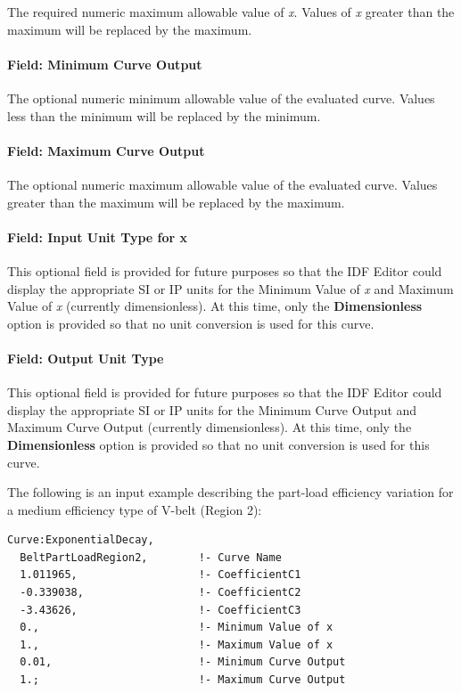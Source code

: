 The required numeric maximum allowable value of \emph{x}. Values of \emph{x} greater than the maximum will be replaced by the maximum.

\paragraph{Field: Minimum Curve Output}\label{field-minimum-curve-output-16}

The optional numeric minimum allowable value of the evaluated curve. Values less than the minimum will be replaced by the minimum.

\paragraph{Field: Maximum Curve Output}\label{field-maximum-curve-output-15}

The optional numeric maximum allowable value of the evaluated curve. Values greater than the maximum will be replaced by the maximum.

\paragraph{Field: Input Unit Type for x}\label{field-input-unit-type-for-x-16}

This optional field is provided for future purposes so that the IDF Editor could display the appropriate SI or IP units for the Minimum Value of \emph{x} and Maximum Value of \emph{x} (currently dimensionless). At this time, only the \textbf{Dimensionless} option is provided so that no unit conversion is used for this curve.

\paragraph{Field: Output Unit Type}\label{field-output-unit-type-15}

This optional field is provided for future purposes so that the IDF Editor could display the appropriate SI or IP units for the Minimum Curve Output and Maximum Curve Output (currently dimensionless). At this time, only the \textbf{Dimensionless} option is provided so that no unit conversion is used for this curve.

The following is an input example describing the part-load efficiency variation for a medium efficiency type of V-belt (Region 2):

\begin{lstlisting}
Curve:ExponentialDecay,
  BeltPartLoadRegion2,        !- Curve Name
  1.011965,                   !- CoefficientC1
  -0.339038,                  !- CoefficientC2
  -3.43626,                   !- CoefficientC3
  0.,                         !- Minimum Value of x
  1.,                         !- Maximum Value of x
  0.01,                       !- Minimum Curve Output
  1.;                         !- Maximum Curve Output
\end{lstlisting}


